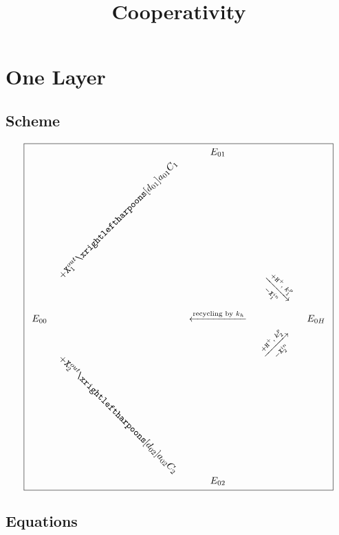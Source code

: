 \documentclass[aps,onecolumn,12pt]{revtex4}
\newcommand{\mychem}[1]{\mathtt{#1}}
\newcommand{\spx}{\mychem{X}}
\newcommand{\spproton}{\mychem{H^+}}
\begin{document}
\title{Cooperativity}
\maketitle

\section{One Layer}

\subsection{Scheme}
\begin{equation}
\boxed{
\begin{array}{ccccc}
 & & E_{01}  &  & \\
 &  \rotatebox{45}{$+\spx_1^{out}\xrightleftharpoons[d_{01}]{a_{01}C_1}$} &   & \rotatebox{-45}{$\xrightarrow[-\spx_1^{in}]{+ \spproton, \; k^p_1}$} &  \\
E_{00}  &  & \xleftarrow{\text{recycling  by } k_h } &   & E_{0H} \\
  & \rotatebox{-45}{$+\spx_2^{out}\xrightleftharpoons[d_{02}]{a_{02}C_2}$} &   & \rotatebox{+45}{$\xrightarrow[-\spx_2^{in}]{+ \spproton, \; k^p_2}$} & \\
 & & E_{02} & & \\
 \end{array}
 }
\end{equation}

\subsection{Equations}
\end{document}
